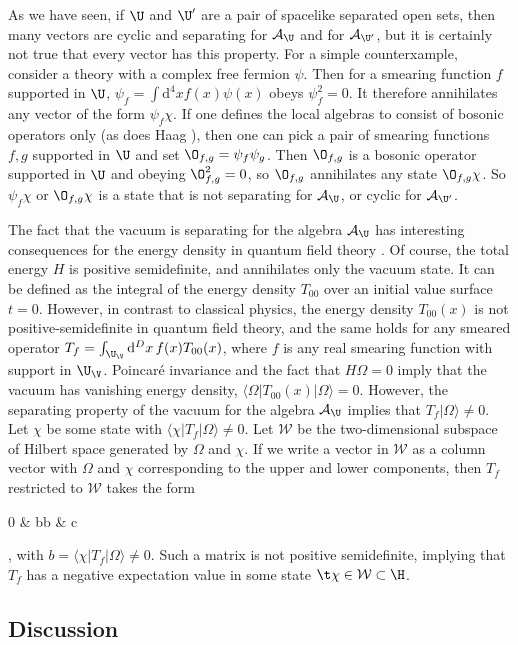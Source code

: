 \documentclass[12pt]{article}
\def\bar{\overline}
\def\ra{\rangle}
\def\bp{\begin{pmatrix}}
\def\ep{\end{pmatrix}}
\def\la{\langle}
\numberwithin{equation}{section}
\def\d{\mathrm d}
\def\bar{\overline}
\def\A{{\mathcal A}}
\def\bar{\overline}
\begin{document}
As we have seen,  if $\U$ and $\U'$ are a pair of spacelike separated open sets, then many vectors are cyclic and separating for
$\A_\U$ and for $\A_{\U'}$, but it is certainly not
true that every vector has this property.  For a simple counterxample, consider a theory with a complex free fermion $\psi$.  
Then for a smearing function $f$ supported
in $\U$,
$\psi_f=\int \d^4x f(x)\psi(x)$ obeys $\psi_f^2=0$.  It therefore annihilates any vector of the form $\psi_f\chi$.   If one defines
the local algebras to consist of bosonic operators only (as does Haag \cite{Haag}), then one
can pick a pair of smearing functions $f,g$ supported
in $\U$ and set $\O_{f,g}=\psi_f\psi_g$.  Then $\O_{f,g}$ is a bosonic operator supported in $\U$ and obeying
 $\O_{f,g}^2=0$, so $\O_{f,g}$ annihilates any
state $\O_{f,g}\chi$.  So $\psi_f\chi$ or $\O_{f,g}\chi$  is a state that is not separating for $\A_\U$, or cyclic
for $\A_{\U'}$.  


The fact that the vacuum is separating for the algebra $\A_\U$ has interesting consequences for the energy density
in quantum field theory \cite{EGJ}.  Of course, the total energy $H$ is positive semidefinite, and annihilates only the vacuum state.  It can be defined as the integral  of the energy density $T_{00}$ over an initial value surface $t=0$.
However, in contrast to classical physics, the energy density $T_{00}(x)$ is not positive-semidefinite in quantum field theory, and the same holds for any smeared operator $T_f=\int_{\U_\V} \d^Dx \,f(x) T_{00}(x)$,
where $f$ is any real smearing function with support in  $\U_\V$.  Poincar\'{e} invariance and the fact that $H\Omega=0$ imply that the
vacuum has vanishing energy density, $\la \Omega|T_{00}(x)|\Omega\ra=0$.     However, the separating property of the vacuum for the algebra $\A_\U$
implies that $T_f|\Omega\ra\not=0$.  Let $\chi$ be some state with $\la \chi|T_f|\Omega\ra\not=0$.  Let $\mathcal W$ be the two-dimensional
subspace of Hilbert space generated by $\Omega$ and $\chi$.   If we write a vector in $\mathcal W$ as a column vector with
$\Omega$ and $\chi$ corresponding to the upper and lower components, then  $T_f$ restricted to $\mathcal W$ takes the form
\be\label{zorof}\bp 0 & b\cr \bar b & c\ep ,\ee
with $b=\la\chi|T_f|\Omega\ra\not=0$.  Such a matrix is not positive semidefinite, implying that $T_f$ has a negative expectation value
in some state $\t\chi\in{\mathcal W}\subset \H$.

\subsection{Discussion} \label{discussion}
\end{document}
